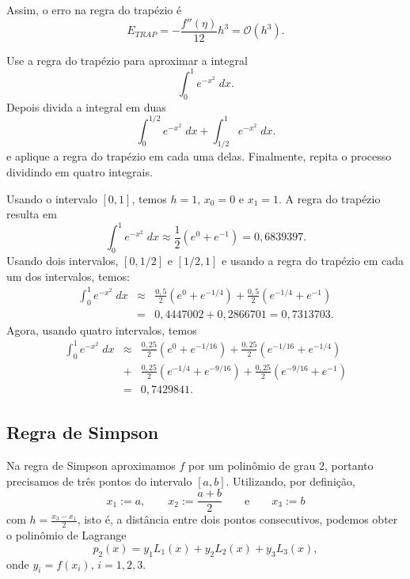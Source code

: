 Assim, o erro na regra do trapézio é
\begin{equation}
E_{TRAP}  = -\frac{f''(\eta)}{12}h^3 = \mathcal{O}(h^3).
\end{equation}

\begin{ex}
Use a regra do trapézio para aproximar a integral
\begin{equation}
\int_0^1e^{-x^2}\;dx.
\end{equation}
Depois divida a integral em duas
\begin{equation}
\int_0^{1/2}e^{-x^2}\;dx+\int_{1/2}^{1}e^{-x^2}\;dx.
\end{equation}
e aplique a regra do trapézio em cada uma delas. Finalmente, repita o processo dividindo em quatro integrais.
\end{ex}
Usando o intervalo $[0,1]$, temos $h=1$, $x_0=0$ e $x_1=1$. A regra do trapézio resulta em
\begin{equation}
\int_0^1e^{-x^2}\;dx\approx \frac{1}{2}(e^{0}+e^{-1})=0,6839397.
\end{equation}
Usando dois intervalos, $[0,1/2]$ e $[1/2,1]$ e usando a regra do trapézio em cada um dos intervalos, temos:
\begin{eqnarray}
\int_0^1e^{-x^2}\;dx &\approx& \frac{0,5}{2}\left(e^{0}+e^{-1/4}\right) + \frac{0,5}{2}\left(e^{-1/4}+e^{-1}\right) \\
&=& 0,4447002+0,2866701 =0,7313703.
\end{eqnarray}
Agora, usando quatro intervalos, temos
\begin{eqnarray}
\int_0^1e^{-x^2}\;dx &\approx& \frac{0,25}{2}\left(e^{0}+e^{-1/16}\right) + \frac{0,25}{2}\left(e^{-1/16}+e^{-1/4}\right) \\
&+& \frac{0,25}{2}\left(e^{-1/4}+e^{-9/16}\right)+\frac{0,25}{2}\left(e^{-9/16}+e^{-1}\right) \\
&=& 0,7429841.
\end{eqnarray}



\subsection{Regra de Simpson}
Na regra de Simpson aproximamos $f$ por um polinômio de grau $2$, portanto precisamos de três pontos do intervalo $[a,b]$. Utilizando, por definição,
\begin{equation}
x_1:=a,\qquad x_2:=\frac{a+b}{2}\qquad \text{e}\qquad x_3:=b
\end{equation}
com $h=\frac{x_3-x_1}{2}$, isto é, a distância entre dois pontos consecutivos, podemos obter o polinômio de Lagrange
\begin{equation}
    p_2(x) = y_1L_1(x) + y_2L_2(x)  + y_3L_3(x),
\end{equation}
onde $y_i=f(x_i)$, $i=1,2,3$.

